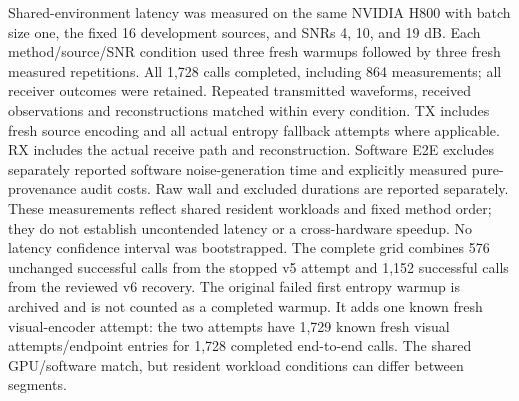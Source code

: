 Shared-environment latency was measured on the same NVIDIA H800 with batch size one, the fixed 16 development sources, and SNRs 4, 10, and 19 dB. Each method/source/SNR condition used three fresh warmups followed by three fresh measured repetitions. All 1,728 calls completed, including 864 measurements; all receiver outcomes were retained. Repeated transmitted waveforms, received observations and reconstructions matched within every condition. TX includes fresh source encoding and all actual entropy fallback attempts where applicable. RX includes the actual receive path and reconstruction. Software E2E excludes separately reported software noise-generation time and explicitly measured pure-provenance audit costs. Raw wall and excluded durations are reported separately. These measurements reflect shared resident workloads and fixed method order; they do not establish uncontended latency or a cross-hardware speedup. No latency confidence interval was bootstrapped. The complete grid combines 576 unchanged successful calls from the stopped v5 attempt and 1,152 successful calls from the reviewed v6 recovery. The original failed first entropy warmup is archived and is not counted as a completed warmup. It adds one known fresh visual-encoder attempt: the two attempts have 1,729 known fresh visual attempts/endpoint entries for 1,728 completed end-to-end calls. The shared GPU/software match, but resident workload conditions can differ between segments.
